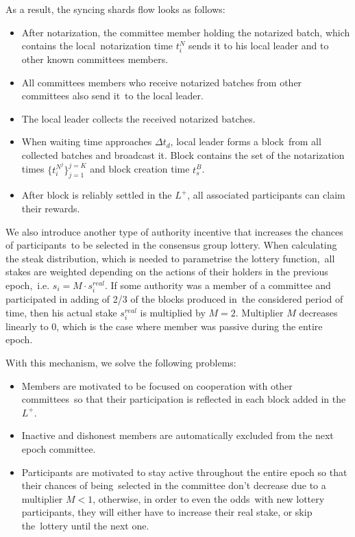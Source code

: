 As a result, the syncing shards flow looks as follows:
\begin{itemize}
    \item After notarization, the committee member holding the notarized batch, which contains the local\
    notarization time $t^N_i$ sends it to his local leader and to other known committees members.
    \item All committees members who receive notarized batches from other committees also send it\
    to the local leader.
    \item The local leader collects the received notarized batches.
    \item When waiting time approaches $\Delta t_d$, local leader forms a block\
    from all collected batches and broadcast it.
    Block contains the set of the notarization times $\{t^{N^j}_i\}_{j=1}^{j=K}$ and block creation time $t^B_s$.
    \item After block is reliably settled in the $L^+$, all associated participants can claim their rewards.
\end{itemize}

We also introduce another type of authority incentive that increases the chances of participants\
to be selected in the consensus group lottery.
When calculating the steak distribution, which is needed to parametrise the lottery function,\
all stakes are weighted depending on the actions of their holders in the previous epoch,\
i.e. ${s_i = M \cdot s_i^{real}}$.
If some authority was a member of a committee and participated in adding of 2/3 of the blocks produced in\
the considered period of time, then his actual stake ${s_i^{real}}$ is multiplied by ${M = 2}$.
Multiplier $M$ decreases linearly to 0, which is the case where member was passive during the entire epoch.

With this mechanism, we solve the following problems:
\begin{itemize}
    \item Members are motivated to be focused on cooperation with other committees\
    so that their participation is reflected in each block added in the $L^+$.
    \item Inactive and dishonest members are automatically excluded from the next epoch committee.
    \item Participants are motivated to stay active throughout the entire epoch so that their chances of being\
    selected in the committee don't decrease due to a multiplier ${M < 1}$, otherwise, in order to even the odds\
    with new lottery participants, they will either have to increase their real stake, or skip the\
    lottery until the next one.
\end{itemize}

